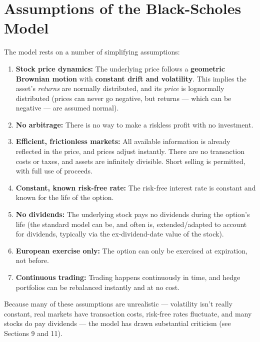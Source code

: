\documentclass[12pt,openany]{book}
\theoremstyle{definition}
\theoremstyle{remark}
\begin{document}
\section{Assumptions of the Black-Scholes Model}

The model rests on a number of simplifying assumptions:

\begin{enumerate}
\item \textbf{Stock price dynamics:} The underlying price follows a \textbf{geometric Brownian motion} with \textbf{constant drift and volatility}. This implies the asset's \emph{returns} are normally distributed, and its \emph{price} is lognormally distributed (prices can never go negative, but returns --- which can be negative --- are assumed normal).


\item \textbf{No arbitrage:} There is no way to make a riskless profit with no investment.


\item \textbf{Efficient, frictionless markets:} All available information is already reflected in the price, and prices adjust instantly. There are no transaction costs or taxes, and assets are infinitely divisible. Short selling is permitted, with full use of proceeds.


\item \textbf{Constant, known risk-free rate:} The risk-free interest rate is constant and known for the life of the option.


\item \textbf{No dividends:} The underlying stock pays no dividends during the option's life (the standard model can be, and often is, extended/adapted to account for dividends, typically via the ex-dividend-date value of the stock).


\item \textbf{European exercise only:} The option can only be exercised at expiration, not before.


\item \textbf{Continuous trading:} Trading happens continuously in time, and hedge portfolios can be rebalanced instantly and at no cost.


\end{enumerate}

Because many of these assumptions are unrealistic --- volatility isn't really constant, real markets have transaction costs, risk-free rates fluctuate, and many stocks do pay dividends --- the model has drawn substantial criticism (see Sections 9 and 11).
\end{document}
